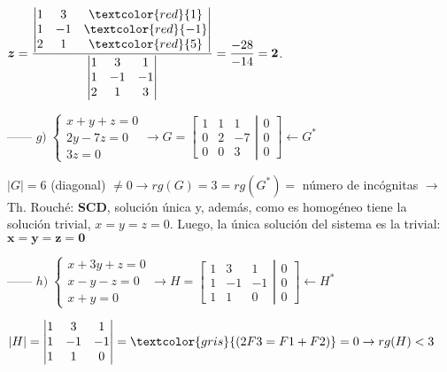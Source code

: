 \begin{proofw}
\begin{multicols}{2}
\noindent \footnotesize{$\boldsymbol{z}= \dfrac {\left| \begin{matrix}  1&3&\textcolor{red}{1}\\1&-1&\textcolor{red}{-1}\\2&1&\textcolor{red}{5} 
\end{matrix} \right|}{\left| \begin{matrix}  1&3&1\\1&-1&-1\\2&1&3 
\end{matrix} \right|}=\dfrac {-28} {-14}=\boldsymbol{2}$}\normalsize{.}

\end{multicols}


------ $g) \; \begin{cases}  x+y+z=0\\2y-7z=0\\3z=0 \end{cases}\to G=\left[ \begin{matrix}  1&1&1\\0&2&-7\\0&0&3  \end{matrix} \right| \left. \begin{matrix} 0\\0\\0 \end{matrix} \right] \leftarrow G^*$

$|G|=6$ \textcolor{gris}{(diagonal)} $\neq 0\to rg(G)=3=rg(G^*)=$ número de incógnitas $\to$ Th. Rouché: \textbf{SCD}, solución única y, además, como es homogéneo tiene la solución trivial, $x=y=z=0$. Luego, la única solución del sistema es la trivial: $\boldsymbol{x=y=z=0}$



------  $h)\; \begin{cases}   x+3y+z=0\\x-y-z=0\\x+y=0\end{cases} \to H=\left[ \begin{matrix} 1&3&1\\1&-1&-1\\1&1&0   \end{matrix} \right|   \left. \begin{matrix} 0\\0\\0 \end{matrix} \right] \leftarrow H^*$

$|H|=\left| \begin{matrix} 1&3&1\\1&-1&-1\\1&1&0   \end{matrix} \right| =\textcolor{gris}{(2F3=F1+F2)}=0 \to rg(H)<3$


\end{proofw}
